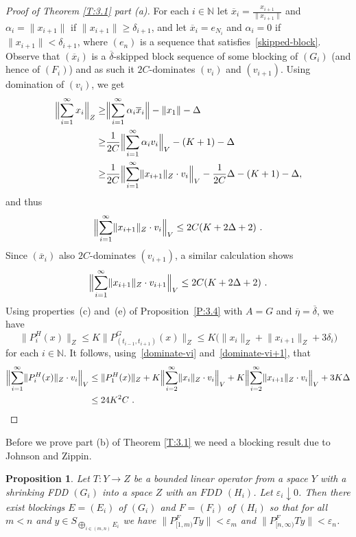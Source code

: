 \documentclass[11pt,leqno]{amsart}
\newtheorem{prop}[thm]{Proposition}
\theoremstyle{definition}
\newcommand{\N}{\mathbb{N}}
\newcommand{\vp}{\varepsilon}
\newcommand{\xb}{\overline{x}}
\newcommand{\norm}[1]{\lVert#1\rVert}
\newcommand{\Bignorm}[1]{\Bigl\lVert#1\Bigr\rVert}
\newcommand{\deltab}{\overline\delta}
\newcommand{\etab}{\overline\eta}
\begin{document}
\begin{proof}[Proof of Theorem \ref{T:3.1} part (a)]
  For each $i\in\N$ let $\xb_i=\frac{x_{i+1}}{\norm{x_{i+1}}}$ and
  $\alpha_i=\norm{x_{i+1}}$ if $\norm{x_{i+1}}\geq\delta_{i+1}$, and
  let $\xb_i=e_{N_i}$ and $\alpha_i=0$ if
  $\norm{x_{i+1}}<\delta_{i+1}$, where $(e_n)$ is a sequence that
  satisfies~\eqref{skipped-block}. Observe that $(\xb_i)$ is a
  $\deltab$-skipped block sequence of some blocking of $(G_i)$ (and
  hence of $(F_i)$) and as such it $2C$-dominates $(v_i)$ and
  $(v_{i+1})$. Using domination of $(v_i)$, we get
  \begin{align}
    \Bignorm{\sum_{i=1}^{\infty}x_i}_Z\geq &\Bignorm{\sum_{i=1}^\infty
      \alpha_i\xb_i}-\norm{x_1}-\Delta\\
    \geq &\frac{1}{2C}\Bignorm{\sum_{i=1}^\infty \alpha_i
      v_i}_V-(K+1)-\Delta\notag\\
    \geq &\frac{1}{2C}\Bignorm{\sum_{i=1}^\infty \norm{x_{i+1}}_Z\cdot
      v_i}_V- \frac{1}{2C}\Delta-(K+1)-\Delta\notag,
  \end{align}
  and thus
  \begin{equation}
    \label{dominate-vi}
    \Bignorm{\sum_{i=1}^\infty \norm{x_{i+1}}_Z\cdot v_i}_V\leq
    2C(K+2\Delta+2)\ .
  \end{equation}
  Since $(\xb_i)$ also $2C$-dominates $(v_{i+1})$, a similar
  calculation shows
  \begin{equation}
    \label{dominate-vi+1}
    \Bignorm{\sum_{i=1}^\infty \norm{x_{i+1}}_Z\cdot v_{i+1}}_V\leq
    2C(K+2\Delta+2)\ .
  \end{equation}
  Using properties~(c) and~(e) of Proposition~\ref{P:3.4} with $A=G$
  and $\etab=\deltab$, we have
  \[
  \norm{P^H_i(x)}_Z\leq K\norm{P^G_{(t_{i-1},t_{i+1})}(x)}_Z \leq
  K\big( \norm{x_i}_Z+\norm{x_{i+1}}_Z+3\delta_i\big)
  \]
  for each $i\in\N$. It follows, using~\eqref{dominate-vi}
  and~\eqref{dominate-vi+1}, that
  \begin{align*}
    \Bignorm{\sum_{i=1}^\infty \norm{P^H_i(x)}_Z\cdot v_i}_V &\leq
    \norm{P^H_1(x)}_Z+K \Bignorm{\sum_{i=2}^\infty
      \norm{x_i}_Z\cdot v_i}_V + K\Bignorm{\sum_{i=2}^\infty
      \norm{x_{i+1}}_Z\cdot v_i}_V + 3K\Delta\\
      &\leq 24K^2C\ .
  \end{align*}
\end{proof}
Before we prove part (b) of Theorem \ref{T:3.1} we need
a blocking result due to Johnson and Zippin.

\begin{prop}
  \label{P:3.6}
  \cite{JZ1}
  Let $T:Y\to Z$ be a bounded linear operator from a space $Y$ with a
  shrinking FDD  $(G_i)$ into a space $Z$ with an  $FDD$ $(H_i)$. Let
  $\vp_i\downarrow 0$. Then there exist blockings $E = (E_i)$ of $(G_i)$
  and $F = (F_i)$ of $(H_i)$ so that for all $m<n$ and $y\in
  S_{\bigoplus_{i\in (m,n)} E_i}$ we have $\|P_{[1,m)}^F Ty\| < \vp_m$
  and $\|P_{[n,\infty)}^F Ty\| <\vp_n$.
\end{prop}
\end{document}
